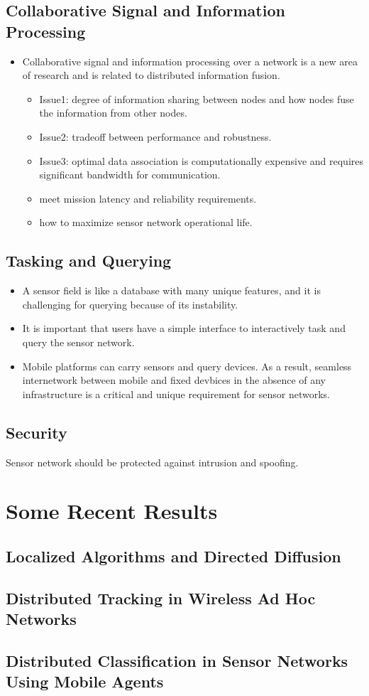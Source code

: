\documentclass[letterpaper,10pt]{article}
\begin{document}
\subsection{Collaborative Signal and Information Processing}

\begin{itemize}
	\item Collaborative signal and information processing over a network is a new area of research and is related to distributed information fusion.
	\begin{itemize}
		\item Issue1: degree of information sharing between nodes and how nodes fuse the information from other nodes.
		\item Issue2: tradeoff between performance and robustness.
		\item Issue3: optimal data association is computationally expensive and requires significant bandwidth for communication.
		\item meet mission latency and reliability requirements.
		\item how to maximize sensor network operational life.
	\end{itemize}
\end{itemize}

\subsection{Tasking and Querying}

\begin{itemize}
	\item A sensor field is like a database with many unique features, and it is challenging for querying because of its instability.
	\item It is important that users have a simple interface to interactively task and query the sensor network.
	\item Mobile platforms can carry sensors and query devices. As a result, seamless internetwork between mobile and fixed devbices in the absence of any infrastructure is a critical and unique requirement for sensor networks.
\end{itemize}

\subsection{Security}

Sensor network should be protected against intrusion and spoofing.

\section{Some Recent Results}

\subsection{Localized Algorithms and Directed Diffusion}

\subsection{Distributed Tracking in Wireless Ad Hoc Networks}

\subsection{Distributed Classification in Sensor Networks Using Mobile Agents}
\end{document}
